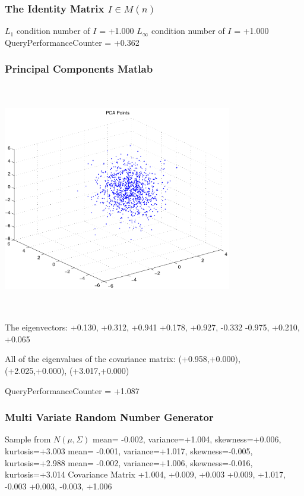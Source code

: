 \documentclass[9pt]{article}
\theoremstyle{plain}
\theoremstyle{definition}
\theoremstyle{remark}
\numberwithin{equation}{section}
\begin{document}
\subsubsection{The Identity Matrix $I \in M(n)$}
$L_1$ condition number of $I$ = +1.000
$L_\infty$ condition number of $I$ = +1.000
QueryPerformanceCounter  =  +0.362
\subsubsection{Principal Components Matlab }
\includegraphics[width=10.0cm,height=10.0cm]{PCAPoints.pdf}

The eigenvectors:
+0.130, +0.312, +0.941
+0.178, +0.927, -0.332
-0.975, +0.210, +0.065

All of the eigenvalues of the covariance matrix:
(+0.958,+0.000), (+2.025,+0.000), (+3.017,+0.000)

QueryPerformanceCounter  =  +1.087
\subsubsection{Multi Variate Random Number Generator }
Sample from $N(\mu,\Sigma)$
mean= -0.002, variance=+1.004, skewness=+0.006, kurtosis=+3.003
mean= -0.001, variance=+1.017, skewness=-0.005, kurtosis=+2.988
mean= -0.002, variance=+1.006, skewness=-0.016, kurtosis=+3.014
Covariance Matrix 
+1.004, +0.009, +0.003
+0.009, +1.017, -0.003
+0.003, -0.003, +1.006
\end{document}
